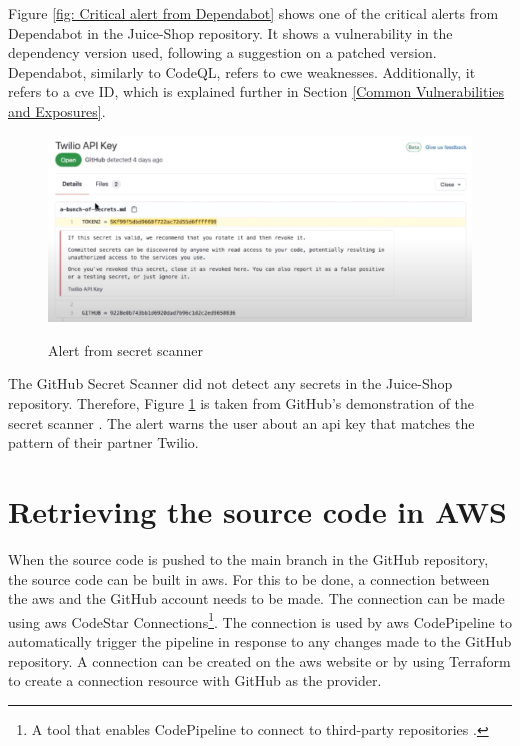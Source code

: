 Figure \ref{fig: Critical alert from Dependabot} shows one of the critical alerts from Dependabot in the Juice-Shop repository. It shows a vulnerability in the dependency version used, following a suggestion on a patched version. Dependabot, similarly to CodeQL, refers to \acrshort{cwe} weaknesses. Additionally, it refers to a \acrshort{cve} ID, which is explained further in Section \ref{Common Vulnerabilities and Exposures}.

\vspace{2mm}
\begin{figure}[H]
    \centering
    \includegraphics[width=0.8\columnwidth]{Images/secretscanneralert.png}
    \caption{Alert from secret scanner} \cite{GitHubVideo}
    \label{fig: Alert from secret scanner}
\end{figure}

The GitHub Secret Scanner did not detect any secrets in the Juice-Shop repository. Therefore, Figure \ref{fig: Alert from secret scanner} is taken from GitHub's demonstration of the secret scanner \cite{GitHubVideo}. The alert warns the user about an \acrshort{api} key that matches the pattern of their partner Twilio. 

\section{Retrieving the source code in AWS}
When the source code is pushed to the main branch in the GitHub repository, the source code can be built in \acrshort{aws}. For this to be done, a connection between the \acrshort{aws} and the GitHub account needs to be made. The connection can be made using \acrshort{aws} CodeStar Connections\footnote{A tool that enables CodePipeline to connect to third-party repositories \cite{CodeStarConnections}.}. The connection is used by \acrshort{aws} CodePipeline to automatically trigger the \gls{pipeline} in response to any changes made to the GitHub repository. A connection can be created on the \acrshort{aws} website or by using Terraform to create a connection resource with GitHub as the provider.

